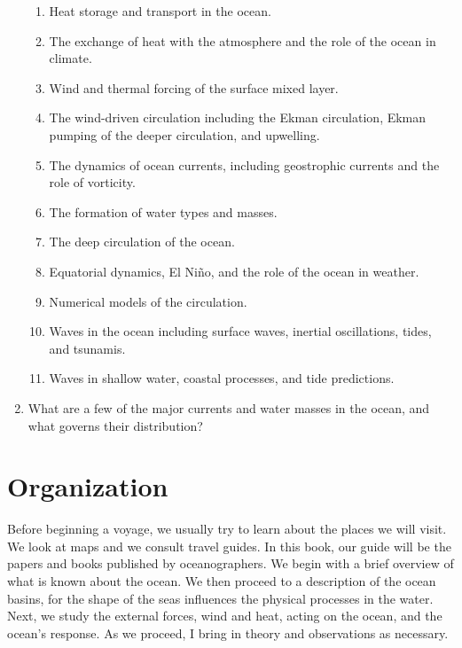 \begin{enumerate}
\begin{enumerate}
\item   Heat storage and transport in the ocean.
\vspace{-0.5ex}
\item   The exchange of heat with the atmosphere and the role of the ocean in climate.
\vspace{-0.5ex}
\item   Wind and thermal forcing of the surface mixed layer.
\vspace{-0.5ex}
\item   The wind-driven circulation including the Ekman circulation, Ekman pumping of the deeper circulation, and upwelling.
\vspace{-0.5ex}
\item   The dynamics of ocean currents, including geostrophic
currents and the role of vorticity.
\vspace{-0.5ex}
\item   The formation of water types and masses.
\vspace{-0.5ex}
\item   The deep circulation of the ocean.
\vspace{-0.5ex}
\item Equatorial dynamics, El Ni\~{n}o, and the role of the ocean in weather.
\vspace{-0.5ex}
\item   Numerical models of the circulation.
\vspace{-0.5ex}
\item   Waves in the ocean including surface waves, inertial
oscillations, tides, and tsunamis.
\vspace{-0.5ex}
\item   Waves in shallow water, coastal processes, and tide predictions.
\end{enumerate}
\vspace{-0.5ex}
\item What are a few of the major currents and water masses in the ocean, and what governs their
distribution?
\end{enumerate}

\section{Organization}
Before beginning a voyage, we usually try to learn about the places we will
visit. We look at maps and we consult travel guides. In this book, our guide will be
the papers and books published by oceanographers. We begin with a brief overview of
what is known about the ocean. We then proceed to a description of the ocean basins,
for the shape of the seas influences the physical processes in the water. Next, we
study the external forces, wind and heat, acting on the ocean, and the ocean's
response. As we proceed, I bring in theory and observations as necessary.

